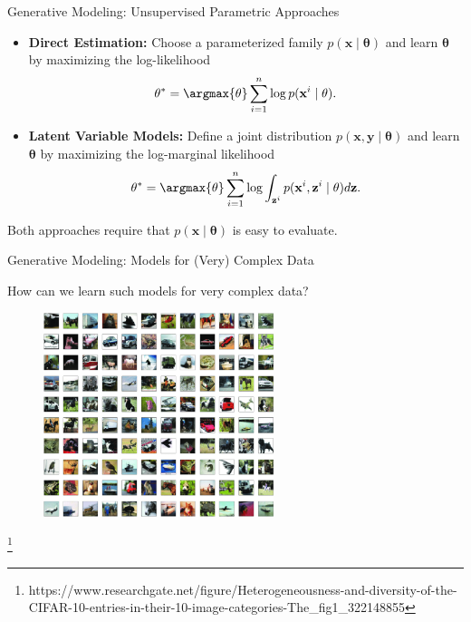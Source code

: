 \documentclass[notheorems]{beamer}
\newcommand{\source}[1]{{\let\thefootnote\relax\footnote{{\tiny #1}}}}
\newcommand{\xx}{\mathbf{x}}
\newcommand{\yy}{\mathbf{y}}
\newcommand{\zz}{\mathbf{z}}
\newcommand{\vtheta}{\mathbf{\theta}}
\begin{document}
    \begin{frame}{Generative Modeling: Unsupervised Parametric Approaches}

        \begin{itemize}
            \item \textbf{Direct Estimation:} Choose a parameterized family $p(\xx \mid \vtheta)$ and learn $\vtheta$ by maximizing the log-likelihood
            \begin{align*}
                \vtheta^{*} = \argmax{\vtheta} \sum_{i=1}^n \log p(\xx^i \mid \vtheta).
            \end{align*}
            \item \textbf{Latent Variable Models:} Define a joint distribution $p(\xx, \yy \mid \vtheta)$ and learn $\vtheta$ by maximizing the log-marginal likelihood
            \begin{align*}
                \vtheta^{*} = \argmax{\vtheta} \sum_{i=1}^n \log \int_{\zz^i} p(\xx^i, \zz^i \mid \vtheta) d \zz.
            \end{align*}
        \end{itemize}

        Both approaches require that $p(\xx \mid \vtheta)$ is easy to evaluate.
    \end{frame}

    \begin{frame}{Generative Modeling: Models for (Very) Complex Data}
        \begin{center} How can we learn such models for very complex data? \end{center}
            \vspace{0.2cm}

        \begin{figure}
            \centering
            \includegraphics[width=0.6\textwidth]{figures/cifar}
        \end{figure}

        \source{https://www.researchgate.net/figure/Heterogeneousness-and-diversity-of-the-CIFAR-10-entries-in-their-10-image-categories-The\_fig1\_322148855}

    \end{frame}
\end{document}
